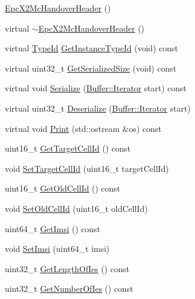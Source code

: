 \begin{DoxyCompactItemize}
\item 
\hyperlink{classns3_1_1EpcX2McHandoverHeader_aab8d3743ef7bb4219281ad03a401b8f3}{Epc\+X2\+Mc\+Handover\+Header} ()
\item 
virtual \hyperlink{classns3_1_1EpcX2McHandoverHeader_a857f11d3f4114e11ec63c50df39ad8dc}{$\sim$\+Epc\+X2\+Mc\+Handover\+Header} ()
\item 
virtual \hyperlink{classns3_1_1TypeId}{Type\+Id} \hyperlink{classns3_1_1EpcX2McHandoverHeader_ae9eba844f595084c6ccfb1af573ab8f8}{Get\+Instance\+Type\+Id} (void) const 
\item 
virtual uint32\+\_\+t \hyperlink{classns3_1_1EpcX2McHandoverHeader_a54107e3ee5154c35d9aae2d55a144ccd}{Get\+Serialized\+Size} (void) const 
\item 
virtual void \hyperlink{classns3_1_1EpcX2McHandoverHeader_aa0ad5d544144be7086b3abbb885308f5}{Serialize} (\hyperlink{classns3_1_1Buffer_1_1Iterator}{Buffer\+::\+Iterator} start) const 
\item 
virtual uint32\+\_\+t \hyperlink{classns3_1_1EpcX2McHandoverHeader_ac8397df8c91bc34bcb8e9966722cf2a1}{Deserialize} (\hyperlink{classns3_1_1Buffer_1_1Iterator}{Buffer\+::\+Iterator} start)
\item 
virtual void \hyperlink{classns3_1_1EpcX2McHandoverHeader_a0096bfa7f39c55fe9198a073d485d3a0}{Print} (std\+::ostream \&os) const 
\item 
uint16\+\_\+t \hyperlink{classns3_1_1EpcX2McHandoverHeader_a560638ca78adf2a780483e9469720093}{Get\+Target\+Cell\+Id} () const 
\item 
void \hyperlink{classns3_1_1EpcX2McHandoverHeader_acebcdd28d1b4a1bab7d03b863846523c}{Set\+Target\+Cell\+Id} (uint16\+\_\+t target\+Cell\+Id)
\item 
uint16\+\_\+t \hyperlink{classns3_1_1EpcX2McHandoverHeader_ace085aa235467bb625ad87e492236ec2}{Get\+Old\+Cell\+Id} () const 
\item 
void \hyperlink{classns3_1_1EpcX2McHandoverHeader_a0e725e4c25b858da0dcfd2974d9e61aa}{Set\+Old\+Cell\+Id} (uint16\+\_\+t old\+Cell\+Id)
\item 
uint64\+\_\+t \hyperlink{classns3_1_1EpcX2McHandoverHeader_a34f0544025a4d6e7fe68c927f75d29d1}{Get\+Imsi} () const 
\item 
void \hyperlink{classns3_1_1EpcX2McHandoverHeader_a4c4054c7c1799afbca643270e9bd792b}{Set\+Imsi} (uint64\+\_\+t imsi)
\item 
uint32\+\_\+t \hyperlink{classns3_1_1EpcX2McHandoverHeader_a825fb3894713664ef9fccae330ef83f7}{Get\+Length\+Of\+Ies} () const 
\item 
uint32\+\_\+t \hyperlink{classns3_1_1EpcX2McHandoverHeader_ad63b0bde8f113ea12a08925862824015}{Get\+Number\+Of\+Ies} () const 
\end{DoxyCompactItemize}
